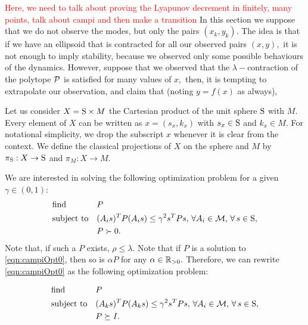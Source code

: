 \textcolor{red}{Here, we need to talk about proving the Lyapunov decrement in finitely, many points, talk about campi and then make a transition}
In this section we suppose that we do not observe the modes, but only the pairs $(x_k,y_k).$
The idea is that if we have an ellipsoid that is contracted for all our observed pairs $(x,y),$  it is not enough to imply stability, because we observed only some possible behaviours of the dynamics.  However, suppose that we observed that the $\lambda-$contraction of the polytope $\mathcal{P}$ is satisfied for many values of $x,$ then, it is tempting to extrapolate our observation, and claim that (noting $y=f(x) $ as always),

Let us consider $X = \text{S} \times M$ the Cartesian product of the unit sphere $\text{S}$ with $M$. Every element of $X$ can be written as $x = (s_x, k_x)$ with $s_x \in \text{S}$ and $k_x \in M$. For notational simplicity, we drop the subscript $x$ whenever it is clear from the context. We define the classical projections of $X$ on the sphere and $M$ by $\pi_{\text{S}}: X \to \text{S}$ and $\pi_M: X \to M$.

We are interested in solving the following optimization problem for a given $\gamma \in (0,1)$:
\begin{equation}
\label{eqn:campiOpt0}
\begin{aligned}
& \text{find} & & P \\
& \text{subject to} 
&  & (A_is)^TP(A_is) \leq \gamma^2 s^TPs,\,\forall A_i \in \mathcal{M}, \,\forall\, s \in \text{S},\\
& && P \succ 0. \\
\end{aligned}
\end{equation}
Note that, if such a $P$ exists, $\rho \leq \lambda$.
Note that if $P$ is a solution to \eqref{eqn:campiOpt0}, then so is $\alpha P$ for any $\alpha \in \mathbb{R}_{> 0}.$ Therefore, we can rewrite \eqref{eqn:campiOpt0} as the following optimization problem:

\begin{equation}
\label{eqn:campiOpt1}
\begin{aligned}
& \text{find} & & P \\
& \text{subject to} 
&  & (A_ks)^TP(A_ks) \leq \gamma^2 s^TPs,\, \forall A_i \in \mathcal{M}, \,\forall\, s \in \text{S},\\
& & & P \succeq I.
\end{aligned}
\end{equation}

